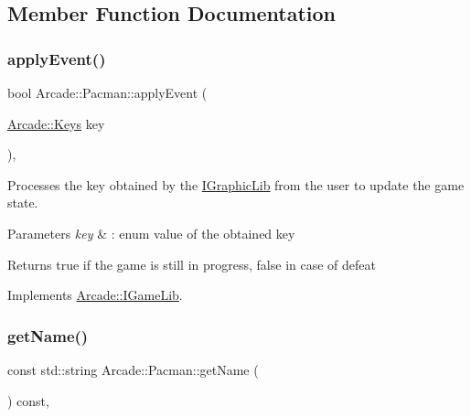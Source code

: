 \subsection{Member Function Documentation}
\mbox{\label{class_arcade_1_1_pacman_ac5fa3a4d5eaa81d37e8b63451265870d}} 
\subsubsection{\texorpdfstring{apply\+Event()}{applyEvent()}}
{\footnotesize\ttfamily bool Arcade\+::\+Pacman\+::apply\+Event (\begin{DoxyParamCaption}\item[{\hyperlink{namespace_arcade_a9b501908b20bc993e4f8226db5323c41}{Arcade\+::\+Keys}}]{key }\end{DoxyParamCaption})\hspace{0.3cm}{\ttfamily [final]}, {\ttfamily [virtual]}}



Processes the key obtained by the \hyperlink{class_arcade_1_1_i_graphic_lib}{I\+Graphic\+Lib} from the user to update the game state. 


\begin{DoxyParams}{Parameters}
{\em key} & \+: enum value of the obtained key \\
\hline
\end{DoxyParams}
\begin{DoxyReturn}{Returns}
true if the game is still in progress, false in case of defeat 
\end{DoxyReturn}


Implements \hyperlink{class_arcade_1_1_i_game_lib_a3b1b66ec00899b4c9efcd6151bf2497e}{Arcade\+::\+I\+Game\+Lib}.

\mbox{\label{class_arcade_1_1_pacman_abc48d59a534276889f45128fe877d5d9}} 
\subsubsection{\texorpdfstring{get\+Name()}{getName()}}
{\footnotesize\ttfamily const std\+::string Arcade\+::\+Pacman\+::get\+Name (\begin{DoxyParamCaption}{ }\end{DoxyParamCaption}) const\hspace{0.3cm}{\ttfamily [final]}, {\ttfamily [virtual]}}




